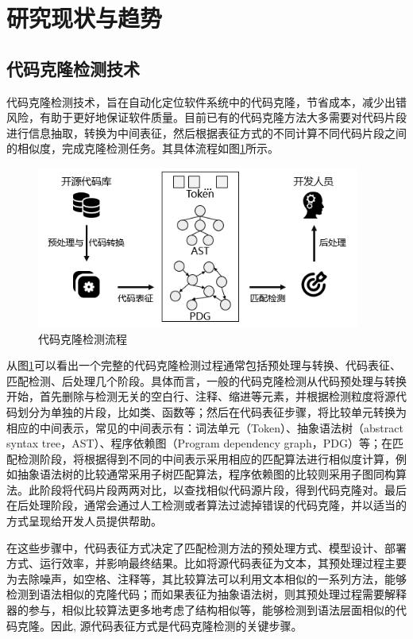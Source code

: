 \section{研究现状与趋势}

\subsection{代码克隆检测技术}
代码克隆检测技术，旨在自动化定位软件系统中的代码克隆，节省成本，减少出错风险，有助于更好地保证软件质量。目前已有的代码克隆方法大多需要对代码片段进行信息抽取，转换为中间表征，然后根据表征方式的不同计算不同代码片段之间的相似度，完成克隆检测任务。其具体流程如图\ref{fig:figure1}所示。
\begin{figure}[H]
    \centering
    \includegraphics[width=0.95\textwidth]{figures/figure1}
    \caption{代码克隆检测流程}\label{fig:figure1}
\end{figure}

从图\ref{fig:figure1}可以看出一个完整的代码克隆检测过程通常包括预处理与转换、代码表征、匹配检测、后处理几个阶段。具体而言，一般的代码克隆检测从代码预处理与转换开始，首先删除与检测无关的空白行、注释、缩进等元素，并根据检测粒度将源代码划分为单独的片段，比如类、函数等；然后在代码表征步骤，将比较单元转换为相应的中间表示，常见的中间表示有：词法单元（Token）、抽象语法树（abstract syntax tree，AST）、程序依赖图（Program dependency graph，PDG）等；在匹配检测阶段，将根据得到不同的中间表示采用相应的匹配算法进行相似度计算，例如抽象语法树的比较通常采用子树匹配算法，程序依赖图的比较则采用子图同构算法。此阶段将代码片段两两对比，以查找相似代码源片段，得到代码克隆对。最后在后处理阶段，通常会通过人工检测或者算法过滤掉错误的代码克隆，并以适当的方式呈现给开发人员提供帮助。

在这些步骤中，代码表征方式决定了匹配检测方法的预处理方式、模型设计、部署方式、运行效率，并影响最终结果\cite{陈秋远2019代码克隆检测研究进展}。比如将源代码表征为文本，其预处理过程主要为去除噪声，如空格、注释等，其比较算法可以利用文本相似的一系列方法，能够检测到语法相似的克隆代码；而如果表征为抽象语法树，则其预处理过程需要解释器的参与，相似比较算法更多地考虑了结构相似等，能够检测到语法层面相似的代码克隆。因此, 源代码表征方式是代码克隆检测的关键步骤。

